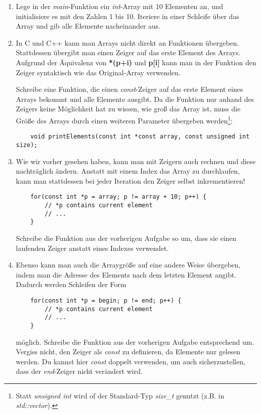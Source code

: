 \begin{enumerate}
\item 
Lege in der \emph{main}-Funktion ein \emph{int}-Array mit 10 Elementen an, und initialisiere es mit den Zahlen 1 bis 10.
Iteriere in einer Schleife über das Array und gib alle Elemente nacheinander aus.

\item
In C und C++ kann man Arrays nicht direkt an Funktionen übergeben.
Stattdessen übergibt man einen Zeiger auf das erste Element des Arrays. Aufgrund der Äquivalenz von \textbf{*(p+i) } und \textbf{p[i]} kann man in der Funktion den Zeiger syntaktisch wie das Original-Array verwenden.

Schreibe eine Funktion, die einen \emph{const}-Zeiger auf das erste Element eines Arrays bekommt und alle Elemente ausgibt.
Da die Funktion nur anhand des Zeigers keine Möglichkeit hat zu wissen, wie groß das Array ist, muss die Größe des Arrays durch einen weiteren Parameter übergeben werden\footnote{Statt \emph{unsigned int} wird of der Standard-Typ \emph{size\_t} genutzt (z.B. in \emph{std::vector}).}:
\begin{lstlisting}
	void printElements(const int *const array, const unsigned int size);
\end{lstlisting}

\item
Wie wir vorher gesehen haben, kann man mit Zeigern auch rechnen und diese nachträglich ändern.
Anstatt mit einem Index das Array zu durchlaufen, kann man stattdessen bei jeder Iteration den Zeiger selbst inkrementieren! 

\begin{lstlisting}
	for(const int *p = array; p != array + 10; p++) {
		// *p contains current element
		// ...
	}
\end{lstlisting}

Schreibe die Funktion aus der vorherigen Aufgabe so um, dass sie einen laufenden Zeiger anstatt eines Indexes verwendet.

\item
Ebenso kann man auch die Arraygröße auf eine andere Weise übergeben, indem man  die Adresse des Elements nach dem letzten Element angibt.
Dadurch werden Schleifen der Form
\begin{lstlisting}
	for(const int *p = begin; p != end; p++) {
		// *p contains current element
		// ...
	}
\end{lstlisting}

möglich.
Schreibe die Funktion aus der vorherigen Aufgabe entsprechend um.
Vergiss nicht, den Zeiger als \emph{const} zu definieren, da Elemente nur gelesen werden.
Du kannst hier \emph{const} doppelt verwenden, um auch sicherzustellen, dass der \emph{end}-Zeiger nicht verändert wird.


\end{enumerate}
